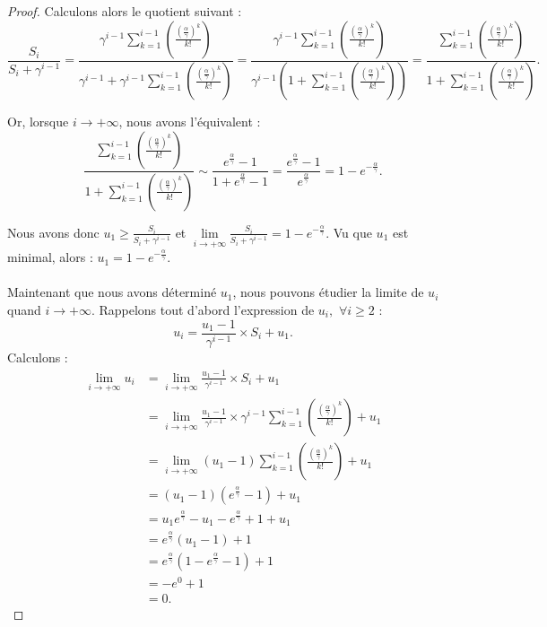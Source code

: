 \documentclass[12pt,a4paper]{report}
\theoremstyle{remark}
\begin{document}
\begin{proof}
Calculons alors le quotient suivant :
$$\frac{S_i}{S_i + \gamma^{i-1}} = \frac{\gamma^{i-1} \sum\limits_{k=1}^{i-1}\left(\frac{\left(\frac{\alpha}{\gamma}\right)^k}{k!}\right)}{\gamma^{i-1} + \gamma^{i-1} \sum\limits_{k=1}^{i-1}\left(\frac{\left(\frac{\alpha}{\gamma}\right)^k}{k!}\right)} = \frac{\gamma^{i-1} \sum\limits_{k=1}^{i-1}\left(\frac{\left(\frac{\alpha}{\gamma}\right)^k}{k!}\right)}{\gamma^{i-1} \left(1 + \sum\limits_{k=1}^{i-1}\left(\frac{\left(\frac{\alpha}{\gamma}\right)^k}{k!}\right)\right)} = \frac{\sum\limits_{k=1}^{i-1}\left(\frac{\left(\frac{\alpha}{\gamma}\right)^k}{k!}\right)}{1 + \sum\limits_{k=1}^{i-1}\left(\frac{\left(\frac{\alpha}{\gamma}\right)^k}{k!}\right)}.$$

Or, lorsque $i \rightarrow +\infty$, nous avons l'équivalent :
$$\frac{\sum\limits_{k=1}^{i-1}\left(\frac{\left(\frac{\alpha}{\gamma}\right)^k}{k!}\right)}{1 + \sum\limits_{k=1}^{i-1}\left(\frac{\left(\frac{\alpha}{\gamma}\right)^k}{k!}\right)} \sim \frac{e^{\frac{\alpha}{\gamma}}-1}{1 + e^{\frac{\alpha}{\gamma}}-1} = \frac{e^{\frac{\alpha}{\gamma}}-1}{e^{\frac{\alpha}{\gamma}}} = 1 - e^{-\frac{\alpha}{\gamma}}.$$

Nous avons donc $u_1 \geqslant \frac{S_i}{S_i + \gamma^{i-1}}$ et $\lim\limits_{i \rightarrow +\infty} \frac{S_i}{S_i + \gamma^{i-1}} = 1 - e^{-\frac{\alpha}{\gamma}}$. Vu que $u_1$ est minimal, alors : $u_1 = 1 - e^{-\frac{\alpha}{\gamma}}.$
\\
\\
Maintenant que nous avons déterminé $u_1$, nous pouvons étudier la limite de $u_i$ quand $i \rightarrow + \infty$. Rappelons tout d'abord l'expression de $u_i, \, \, \forall i \geqslant 2$ :
$$u_i = \frac{u_1 - 1}{\gamma^{i-1}} \times S_i + u_1.$$
Calculons :
\begin{align*}
\lim\limits_{i \rightarrow +\infty} u_i &= \lim\limits_{i \rightarrow +\infty} \frac{u_1 - 1}{\gamma^{i-1}} \times S_i + u_1 \\
&= \lim\limits_{i \rightarrow +\infty} \frac{u_1 - 1}{\gamma^{i-1}} \times \gamma^{i-1} \sum_{k=1}^{i-1}\left(\frac{\left(\frac{\alpha}{\gamma}\right)^k}{k!}\right) + u_1 \\
&= \lim\limits_{i \rightarrow +\infty} (u_1 - 1) \sum_{k=1}^{i-1}\left(\frac{\left(\frac{\alpha}{\gamma}\right)^k}{k!}\right) + u_1 \\
&= (u_1 - 1)(e^{\frac{\alpha}{\gamma}}-1) + u_1 \\
&= u_1 e^{\frac{\alpha}{\gamma}} - u_1 - e^{\frac{\alpha}{\gamma}} + 1 + u_1 \\
&= e^{\frac{\alpha}{\gamma}} (u_1 - 1) + 1 \\
&= e^{\frac{\alpha}{\gamma}}(1 - e^{\frac{\alpha}{\gamma}} - 1) + 1 \\
&= -e^0 + 1 \\
&= 0.
\end{align*}
\end{proof}
\end{document}
